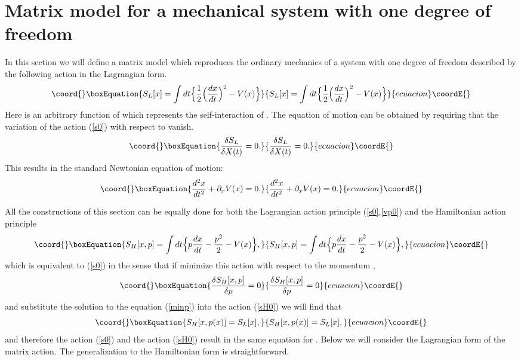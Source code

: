 \documentclass[a4paper,11pt]{article}
\begin{document}
\section{Matrix model for a mechanical system with one degree of
freedom} \label{sec2} In this section we will define a matrix
model which reproduces the ordinary mechanics of a system with one
degree of freedom \coordHE{} described by the following action  \coordHE{}
in the Lagrangian form.
\begin{equation}\coord{}\boxEquation{
S_{L}[x] =\int dt \Big\{ \frac{1}{2}\Big(\frac{dx}{dt} \Big)^2 -
V(x) \Big\} \label{s0}
}{
S_{L}[x] =\int dt \Big\{ \frac{1}{2}\Big(\frac{dx}{dt} \Big)^2 -
V(x) \Big\} }{ecuacion}\coordE{}\end{equation}
Here \coordHE{} is an arbitrary function of \coordHE{} which represents the
self-interaction of \coordHE{}. The equation of motion can be obtained by
requiring that the variation of  the action (\ref{s0}) with
respect to \coordHE{} vanish.
\begin{equation}\coord{}\boxEquation{
\frac{\delta S_{L}}{\delta X(t)}=0. \label{vp0}
}{
\frac{\delta S_{L}}{\delta X(t)}=0. }{ecuacion}\coordE{}\end{equation}
This results in the standard Newtonian equation of motion:
\begin{equation}\coord{}\boxEquation{
\frac{d^2x}{dt^2}+\partial_x V(x)=0. \label{ne}
}{
\frac{d^2x}{dt^2}+\partial_x V(x)=0. }{ecuacion}\coordE{}\end{equation}

All the constructions of this section can be equally done for both
the Lagrangian action principle (\ref{s0},\ref{vp0}) and the
Hamiltonian action principle
\begin{equation}\coord{}\boxEquation{
S_{H}[x,p] =\int dt \Big\{ p\frac{dx}{dt} -\frac{p^2}{2} - V(x)
\Big\}, \label{sH0}
}{
S_{H}[x,p] =\int dt \Big\{ p\frac{dx}{dt} -\frac{p^2}{2} - V(x)
\Big\}, }{ecuacion}\coordE{}\end{equation}
which is equivalent to (\ref{s0}) in the sense that  if minimize
this action with respect to the momentum \coordHE{},
\begin{equation}\coord{}\boxEquation{
\frac{\delta S_{H}[x,p]}{\delta p}=0 \label{minp}
}{
\frac{\delta S_{H}[x,p]}{\delta p}=0 }{ecuacion}\coordE{}\end{equation}
and substitute the solution to the equation (\ref{minp}) \coordHE{}
into the action (\ref{sH0}) we will find that
\begin{equation}\coord{}\boxEquation{
S_{H}[x,p(x)]=S_L[x],
}{
S_{H}[x,p(x)]=S_L[x],
}{ecuacion}\coordE{}\end{equation}
and therefore the action (\ref{s0}) and the action (\ref{sH0})
result in the same equation for \coordHE{}.  Below we will consider the
Lagrangian form of the matrix action. The generalization to the
Hamiltonian form is straightforward.
\end{document}
